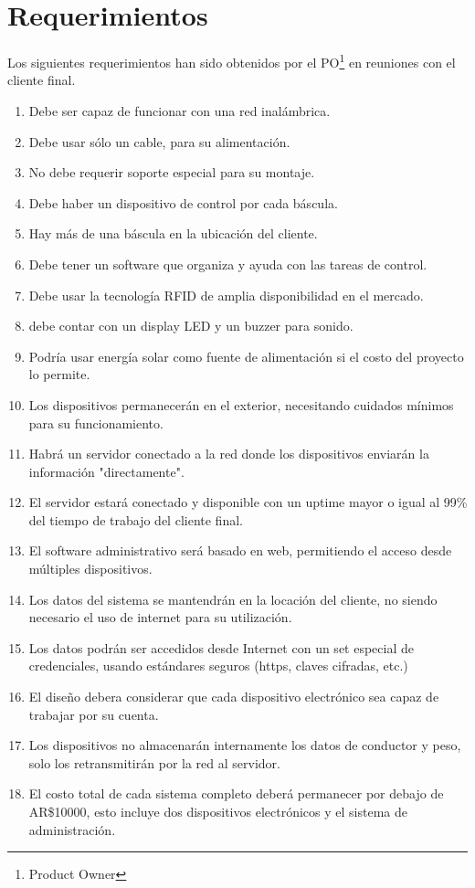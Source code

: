 \section{Requerimientos}
Los siguientes requerimientos han sido obtenidos por el PO\footnote{Product Owner} en reuniones con el cliente final.
\begin{enumerate}
	\item Debe ser capaz de funcionar con una red inal\'ambrica.
	\item Debe usar s\'olo un cable, para su alimentaci\'on.
	\item No debe requerir soporte especial para su montaje.
	\item Debe haber un dispositivo de control por cada b\'ascula.
	\item Hay m\'as de una b\'ascula en la ubicaci\'on del cliente.
	\item Debe tener un software que organiza y ayuda con las tareas de control.
	\item Debe usar la tecnolog\'ia RFID de amplia disponibilidad en el mercado.
	\item debe contar con un display LED y un buzzer para sonido.
	\item Podr\'ia usar energ\'ia solar como fuente de alimentaci\'on si el costo del proyecto lo permite.
	\item Los dispositivos permanecer\'an en el exterior, necesitando cuidados m\'inimos para su funcionamiento.
	\item Habr\'a un servidor conectado a la red donde los dispositivos enviar\'an  la informaci\'on "directamente".
	\item El servidor estar\'a conectado y disponible con un uptime mayor o igual al 99\% del tiempo de trabajo del cliente final.
	\item El software administrativo ser\'a basado en web, permitiendo el acceso desde m\'ultiples dispositivos.
	\item Los datos del sistema se mantendr\'an en la locaci\'on del cliente, no siendo necesario el uso de internet para su utilizaci\'on.
	\item Los datos podr\'an ser accedidos desde Internet con un set especial de credenciales, usando est\'andares seguros (https, claves cifradas, etc.)
	\item El dise\~no debera considerar que cada dispositivo electr\'onico sea capaz de trabajar por su cuenta.
	\item Los dispositivos no almacenar\'an internamente los datos de conductor y peso, solo los retransmitir\'an por la red al servidor.
	\item El costo total de cada sistema completo deber\'a permanecer por debajo de AR\$10000, esto incluye dos dispositivos electr\'onicos y el sistema de administraci\'on.
\end{enumerate}

